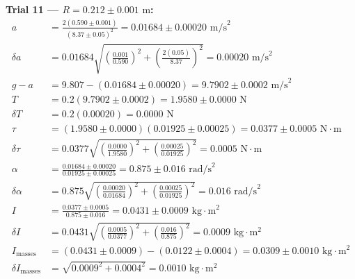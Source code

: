 \documentclass[11pt]{article}
\begin{document}
\textbf{Trial 11 — $R = 0.212 \pm 0.001\text{ m}$:}
\begin{align*}
a &= \frac{2(0.590 \pm 0.001)}{(8.37 \pm 0.05)^2} = 0.01684 \pm 0.00020\text{ m/s}^2 \\
\delta a &= 0.01684\sqrt{\left(\frac{0.001}{0.590}\right)^2 + \left(\frac{2(0.05)}{8.37}\right)^2} = 0.00020\text{ m/s}^2 \\
g - a &= 9.807 - (0.01684 \pm 0.00020) = 9.7902 \pm 0.0002\text{ m/s}^2 \\
T &= 0.2(9.7902 \pm 0.0002) = 1.9580 \pm 0.0000\text{ N} \\
\delta T &= 0.2(0.00020) = 0.0000\text{ N} \\
\tau &= (1.9580 \pm 0.0000)(0.01925 \pm 0.00025) = 0.0377 \pm 0.0005\text{ N}\cdot\text{m} \\
\delta\tau &= 0.0377\sqrt{\left(\frac{0.0000}{1.9580}\right)^2 + \left(\frac{0.00025}{0.01925}\right)^2} = 0.0005\text{ N}\cdot\text{m} \\
\alpha &= \frac{0.01684 \pm 0.00020}{0.01925 \pm 0.00025} = 0.875 \pm 0.016\text{ rad/s}^2 \\
\delta\alpha &= 0.875\sqrt{\left(\frac{0.00020}{0.01684}\right)^2 + \left(\frac{0.00025}{0.01925}\right)^2} = 0.016\text{ rad/s}^2 \\
I &= \frac{0.0377 \pm 0.0005}{0.875 \pm 0.016} = 0.0431 \pm 0.0009\text{ kg}\cdot\text{m}^2 \\
\delta I &= 0.0431\sqrt{\left(\frac{0.0005}{0.0377}\right)^2 + \left(\frac{0.016}{0.875}\right)^2} = 0.0009\text{ kg}\cdot\text{m}^2 \\
I_{\text{masses}} &= (0.0431 \pm 0.0009) - (0.0122 \pm 0.0004) = 0.0309 \pm 0.0010\text{ kg}\cdot\text{m}^2 \\
\delta I_{\text{masses}} &= \sqrt{0.0009^2 + 0.0004^2} = 0.0010\text{ kg}\cdot\text{m}^2
\end{align*}
\end{document}
